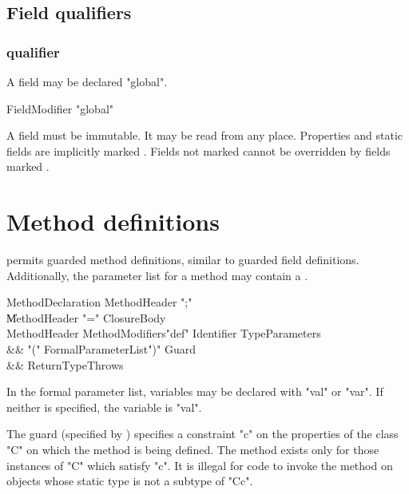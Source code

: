 \subsection{Field qualifiers}
\label{FieldQualifier}

\subsubsection{ qualifier}
\label{GlobalField}

A field may be declared \xcd"global".

\begin{grammar}
  FieldModifier \: \xcd"global"  
\end{grammar}

A  field must be immutable. It may be read from any place.
Properties and static fields are implicitly marked .
Fields not marked  cannot be overridden by fields marked
.

\section{Method definitions}

\Xten{} permits guarded method definitions, similar to guarded
field definitions. Additionally, the parameter list for a method may
contain a .

\begin{grammar}
MethodDeclaration \: MethodHeader \xcd";" \\
                  \| MethodHeader \xcd"=" ClosureBody \\
MethodHeader \:  
  MethodModifiers\opt \xcd"def" Identifier TypeParameters\opt \\
&& \xcd"(" 
  FormalParameterList\opt \xcd")" Guard\opt \\
  && ReturnType\opt Throws\opt \\
\end{grammar}

In the formal parameter list, variables may be declared with
\xcd"val" or \xcd"var".  If neither is specified, the variable
is \xcd"val".

\label{MethodGuard}

The guard (specified by )
specifies a constraint \xcd"c" on the
properties of the class \xcd"C" on which the method is being defined. The
method exists only for those instances of \xcd"C" which satisfy \xcd"c".  It is
illegal for code to invoke the method on objects whose static type is
not a subtype of \xcd"C{c}".

